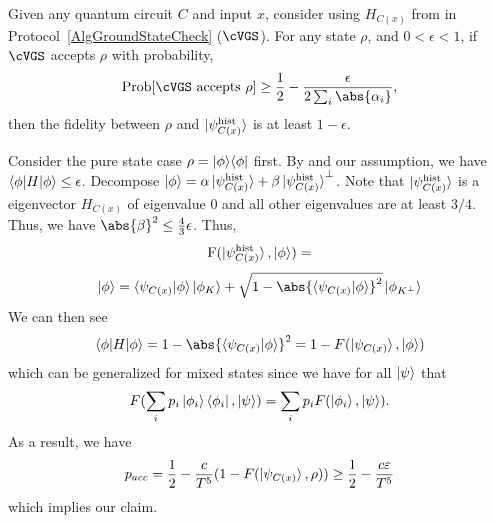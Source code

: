 \begin{theorem} \label{thm:HamCheckClose}
Given any quantum circuit $C$ and input $x$, consider using $H_{C(x)}$ from  in Protocol~\ref{AlgGroundStateCheck} ($\cVGS$). 
For any state $\rho$, and $0< \epsilon < 1$, if $\cVGS$ accepts $\rho$ with probability, 
\[
 \mathrm{Prob}[\cVGS \text{ accepts } \rho] \geq \frac{1}{2} - \frac{\epsilon}{2 \sum_i \abs{\alpha_i}},
\]
then the fidelity between $\rho$ and $\ket{\psi_{C(x)}^{\mathrm{hist}}}$ is at least $1-\epsilon$. 
\end{theorem}

\begin{prf} Consider the pure state case $\rho=|\phi\rangle\langle \phi|$ first. By  and our assumption, we have $\braket{\phi|H|\phi} \leq \epsilon$. 
Decompose $\ket{\phi}= \alpha \ket{\psi_{C(x)}^{\mathrm{hist}}} + \beta \ket{\psi_{C(x)}^{\mathrm{hist}}}^\bot$. Note that $\ket{\psi_{C(x)}^{\mathrm{hist}}}$ is a eigenvector $H_{C(x)}$ of eigenvalue 0 and all other eigenvalues are at least $3/4$. Thus, we have $\abs{\beta}^2 \leq \frac{4}{3}\epsilon$. Thus, 
\[
  \mathrm{F}(\ket{\psi_{C(x)}^{\mathrm{hist}}}, \ket{\phi}) =
\] 
$$\ket{\phi}=\braket{\psi_{C(x)}|\phi}\ket{\phi_K}+\sqrt{1-\abs{\braket{\psi_{C(x)}|\phi}}^2}\ket{\phi_{K^\bot}}$$
	We can then see
	$$\braket{\phi|H|\phi}=1-\abs{\braket{\psi_{C(x)}|\phi}}^2=1-F(\ket{\psi_{C(x)}}, \ket{\phi})$$
	which can be generalized for mixed states since we have for all $\ket\psi$ that
	$$F(\sum_i p_i \ket{\phi_i}\bra{\phi_i}, \ket\psi)=\sum_i p_i F(\ket{\phi_i}, \ket\psi).$$
	As a result, we have
	$$p_{acc}=\frac{1}{2}-\frac{c}{T^5}(1-F(\ket{\psi_{C(x)}}, \rho))\geq\frac{1}{2}-\frac{c\varepsilon}{T^5}$$
	which implies our claim.
\end{prf}

